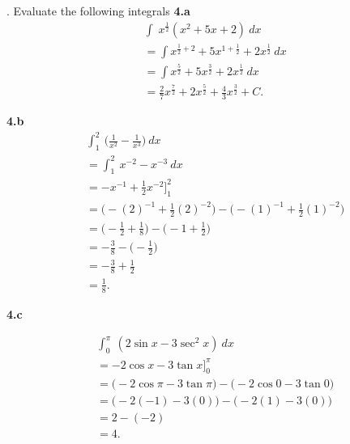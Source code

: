 \documentclass{report}
\begin{document}
    \pagebreak \bigbreak {}. Evaluate the following integrals
    \bigbreak \noindent 
    \textbf{4.a}
    \begin{align*}
        &\int_{}^{}\ x^{\frac{1}{2}}(x^{2}+5x+2)\ dx \\
        &=\int x^{\frac{1}{2}+2}+5x^{1+\frac{1}{2}}+2x^{\frac{1}{2}}\ dx \\
        &=\int x^{\frac{5}{2}}+5x^{\frac{3}{2}}+2x^{\frac{1}{2}}\ dx \\
        &= \frac{2}{7}x^{\frac{7}{2}} + 2x^{\frac{5}{2}}+\frac{4}{3}x^{\frac{3}{2}} + C
    .\end{align*}

    \bigbreak \noindent 
    \textbf{4.b}
    \begin{align*}
        &\int_{1}^{2}\ \bigg(\frac{1}{x^{2}} -\frac{1}{x^{3}}\bigg)\ dx \\
        &=\int_{1}^{2}\ x^{-2}-x^{-3}\ dx \\
        &=-x^{-1}+\frac{1}{2}x^{-2}\bigg]^{2}_1 \\
        &=\bigg(-(2)^{-1}+\frac{1}{2}(2)^{-2}\bigg) - \bigg(-(1)^{-1}+\frac{1}{2}(1)^{-2}\bigg) \\
        &= \bigg(-\frac{1}{2}+\frac{1}{8}\bigg) - \bigg(-1 + \frac{1}{2}\bigg) \\
        &=-\frac{3}{8} - \bigg(-\frac{1}{2}\bigg) \\
        &= -\frac{3}{8} + \frac{1}{2} \\
        &=\frac{1}{8}
    .\end{align*}

    \bigbreak \noindent 
    \textbf{4.c}
    \bigbreak \noindent 
    \begin{minipage}{0.7\textwidth}
    \begin{align*}
        &\int_{0}^{\pi}\ (2\sin{x}-3\sec^{2}{x})\ dx \\
        &=-2\cos{x}-3\tan{x}\bigg]^{\pi}_0 \\
        &= \bigg(-2\cos{\pi}-3\tan{\pi}\bigg) - \bigg(-2\cos{0}-3\tan{0}\bigg) \\
        &= \bigg(-2(-1)-3(0)\bigg) - \bigg(-2(1)-3(0)\bigg) \\
        &= 2 - (-2) \\
        &= 4
    .\end{align*}
    \end{minipage}
\end{document}
